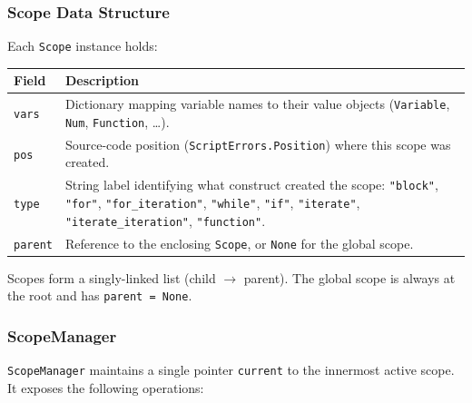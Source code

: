 \subsubsection{Scope Data Structure}

Each \texttt{Scope} instance holds:

\begin{center}
\begin{tabular}{|l|p{9cm}|}
\hline
\textbf{Field} & \textbf{Description} \\
\hline
\texttt{vars}   & Dictionary mapping variable names to their value objects (\texttt{Variable}, \texttt{Num}, \texttt{Function}, \ldots). \\
\hline
\texttt{pos}    & Source-code position (\texttt{ScriptErrors.Position}) where this scope was created. \\
\hline
\texttt{type}   & String label identifying what construct created the scope: \texttt{"block"}, \texttt{"for"}, \texttt{"for\_iteration"}, \texttt{"while"}, \texttt{"if"}, \texttt{"iterate"}, \texttt{"iterate\_iteration"}, \texttt{"function"}. \\
\hline
\texttt{parent} & Reference to the enclosing \texttt{Scope}, or \texttt{None} for the global scope. \\
\hline
\end{tabular}
\end{center}

Scopes form a singly-linked list (child $\to$ parent).  The global scope
is always at the root and has \texttt{parent = None}.

\subsubsection{ScopeManager}

\texttt{ScopeManager} maintains a single pointer \texttt{current} to the
innermost active scope.  It exposes the following operations:

